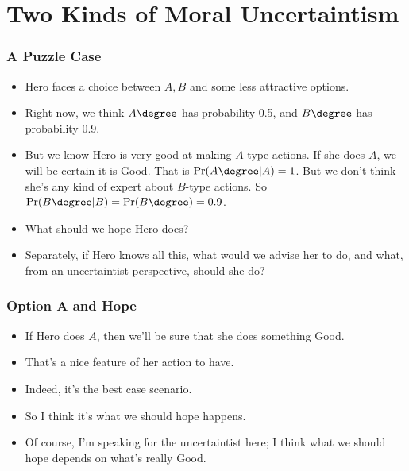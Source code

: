\section{Two Kinds of Moral Uncertaintism}
\label{twokindsofmoraluncertaintism}

\begin{frame}[fragile]
\frametitle{A Puzzle Case}
\label{apuzzlecase}

\begin{itemize}
\item{} Hero faces a choice between $A, B$ and some less attractive options.

\item{} Right now, we think $A\degree$ has probability 0.5, and $B\degree$ has probability 0.9.

\item{} But we know Hero is very good at making $A$-type actions. If she does $A$, we will be certain it is Good. That is $\Pr(A\degree | A) = 1$. But we don't think she's any kind of expert about $B$-type actions. So $\Pr(B\degree | B) = \Pr(B\degree) = 0.9$.

\item{} What should we hope Hero does?

\item{} Separately, if Hero knows all this, what would we advise her to do, and what, from an uncertaintist perspective, should she do?

\end{itemize}

\end{frame}

\begin{frame}[fragile]
\frametitle{Option A and Hope}
\label{optionaandhope}

\begin{itemize}
\item{} If Hero does $A$, then we'll be sure that she does something Good.

\item{} That's a nice feature of her action to have.

\item{} Indeed, it's the best case scenario.

\item{} So I think it's what we should hope happens. \pause 

\item{} Of course, I'm speaking for the uncertaintist here; I think what we should hope depends on what's really Good.

\end{itemize}

\end{frame}

